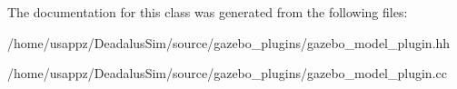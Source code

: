 \-The documentation for this class was generated from the following files\-:\begin{DoxyCompactItemize}
\item 
/home/usappz/\-Deadalus\-Sim/source/gazebo\-\_\-plugins/gazebo\-\_\-model\-\_\-plugin.\-hh\item 
/home/usappz/\-Deadalus\-Sim/source/gazebo\-\_\-plugins/gazebo\-\_\-model\-\_\-plugin.\-cc\end{DoxyCompactItemize}
